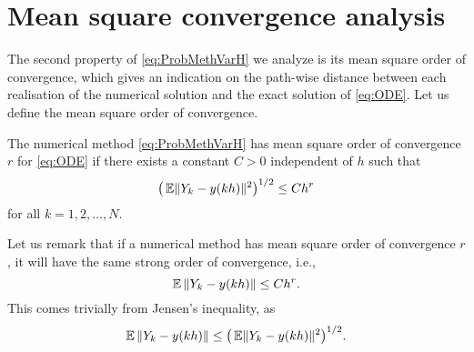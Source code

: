 \documentclass{siamart1116}
\numberwithin{theorem}{section}
\DeclarePairedDelimiter{\norm}{\|}{\|}
\newcommand{\E}{\operatorname{\mathbb{E}}}
\newcommand{\corr}[1]{{\color{bordeaux}#1}}
\begin{document}
\section{Mean square convergence analysis}\label{sec:StrongOrder}

The second property of \eqref{eq:ProbMethVarH} we analyze is its mean square order of convergence, which gives an indication on the path-wise distance between each realisation of the numerical solution and the exact solution of \eqref{eq:ODE}. Let us define the mean square order of convergence. 
\begin{definition} The numerical method \eqref{eq:ProbMethVarH} has mean square order of convergence $r$ for \eqref{eq:ODE} if there exists a constant $C > 0$ independent of $h$ such that
	\begin{equation}
	\big(\E\norm{Y_k - y(kh)}^2\big)^{1/2} \leq Ch^r
	\end{equation}
	for all $k = 1, 2, \ldots, N$.
\end{definition} 
\corr{\begin{remark} Let us remark that if a numerical method has mean square order of convergence $r$, it will have the same strong order of convergence, i.e., 
	\begin{equation}
		\E{\norm{Y_k - y(kh)}} \leq Ch^r.
	\end{equation}	
	This comes trivially from Jensen's inequality, as
	\begin{equation}
		\E{\norm{Y_k - y(kh)}} \leq \big(\E\norm{Y_k - y(kh)}^2\big)^{1/2}.
	\end{equation}
\end{remark}}
\end{document}
